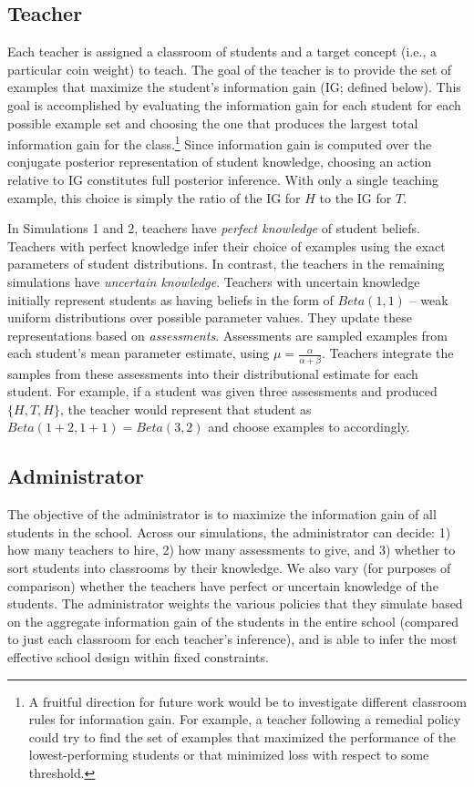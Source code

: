 \documentclass[10pt, letterpaper]{article}
\begin{document}
\subsection{Teacher}\label{teacher}

Each teacher is assigned a classroom of students and a target concept
(i.e., a particular coin weight) to teach. The goal of the teacher is to
provide the set of examples that maximize the student's information gain
(IG; defined below). This goal is accomplished by evaluating the
information gain for each student for each possible example set and
choosing the one that produces the largest total information gain for
the class.\footnote{A fruitful direction for future work would be to
  investigate different classroom rules for information gain. For
  example, a teacher following a remedial policy could try to find the
  set of examples that maximized the performance of the
  lowest-performing students or that minimized loss with respect to some
  threshold.} Since information gain is computed over the conjugate
posterior representation of student knowledge, choosing an action
relative to IG constitutes full posterior inference. With only a single
teaching example, this choice is simply the ratio of the IG for \(H\) to
the IG for \(T\).

In Simulations 1 and 2, teachers have \emph{perfect knowledge} of
student beliefs. Teachers with perfect knowledge infer their choice of
examples using the exact parameters of student distributions. In
contrast, the teachers in the remaining simulations have \emph{uncertain
knowledge}. Teachers with uncertain knowledge initially represent
students as having beliefs in the form of \(Beta(1,1)\) -- weak uniform
distributions over possible parameter values. They update these
representations based on \emph{assessments}. Assessments are sampled
examples from each student's mean parameter estimate, using
\(\mu = \frac{\alpha}{\alpha + \beta}\). Teachers integrate the samples
from these assessments into their distributional estimate for each
student. For example, if a student was given three assessments and
produced \(\{H, T, H\}\), the teacher would represent that student as
\(Beta(1+2,1+1) = Beta(3,2)\) and choose examples to accordingly.

\subsection{Administrator}\label{administrator}

The objective of the administrator is to maximize the information gain
of all students in the school. Across our simulations, the administrator
can decide: 1) how many teachers to hire, 2) how many assessments to
give, and 3) whether to sort students into classrooms by their
knowledge. We also vary (for purposes of comparison) whether the
teachers have perfect or uncertain knowledge of the students. The
administrator weights the various policies that they simulate based on
the aggregate information gain of the students in the entire school
(compared to just each classroom for each teacher's inference), and is
able to infer the most effective school design within fixed constraints.
\end{document}
